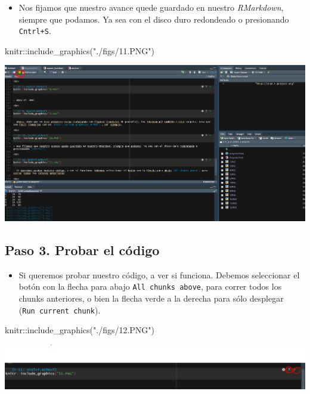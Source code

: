 \documentclass[
]{article}
\newenvironment{Shaded}{}{}
\newcommand{\FunctionTok}[1]{\textcolor[rgb]{0.02,0.16,0.49}{#1}}
\newcommand{\NormalTok}[1]{#1}
\newcommand{\SpecialCharTok}[1]{\textcolor[rgb]{0.25,0.44,0.63}{#1}}
\newcommand{\StringTok}[1]{\textcolor[rgb]{0.25,0.44,0.63}{#1}}
\providecommand{\tightlist}{%
  \setlength{\itemsep}{0pt}\setlength{\parskip}{0pt}}
\begin{document}
\begin{itemize}
\tightlist
\item
  Nos fijamos que nuestro avance quede guardado en nuestro
  \emph{RMarkdown}, siempre que podamos. Ya sea con el disco duro
  redondeado o presionando \texttt{Cntrl+S}.
\end{itemize}

\begin{Shaded}
\begin{Highlighting}[]
\NormalTok{knitr}\SpecialCharTok{::}\FunctionTok{include\_graphics}\NormalTok{(}\StringTok{"./figs/11.PNG"}\NormalTok{)}
\end{Highlighting}
\end{Shaded}

\begin{center}\includegraphics[width=0.6\linewidth]{./figs/11} \end{center}

\hypertarget{paso-3.-probar-el-cuxf3digo}{%
\subsection{Paso 3. Probar el
código}\label{paso-3.-probar-el-cuxf3digo}}

\begin{itemize}
\tightlist
\item
  Si queremos probar nuestro código, a ver si funciona. Debemos
  seleccionar el botón con la flecha para abajo
  \texttt{All\ chunks\ above}, para correr todos los chunks anteriores,
  o bien la flecha verde a la derecha para sólo desplegar
  (\texttt{Run\ current\ chunk}).
\end{itemize}

\begin{Shaded}
\begin{Highlighting}[]
\NormalTok{knitr}\SpecialCharTok{::}\FunctionTok{include\_graphics}\NormalTok{(}\StringTok{"./figs/12.PNG"}\NormalTok{)}
\end{Highlighting}
\end{Shaded}

\begin{center}\includegraphics[width=0.6\linewidth]{./figs/12} \end{center}
\end{document}
